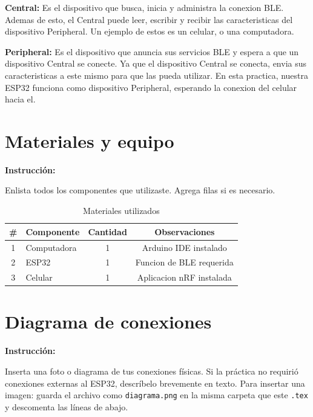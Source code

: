 \documentclass[12pt, letterpaper]{article}
\newenvironment{instruccion}{%
  \begin{mdframed}[
    backgroundcolor = tealLight,
    linecolor       = tealMain,
    linewidth       = 1pt,
    innerleftmargin = 10pt, innerrightmargin = 10pt,
    innertopmargin  = 6pt,  innerbottommargin= 6pt
  ]
  \small\color{tealMain}\textbf{Instrucción:}\hspace{4pt}\color{black}
}{%
  \end{mdframed}
}
\begin{document}
\textbf{Central:} Es el dispositivo que busca, inicia y administra la conexion BLE. Ademas de esto, el Central puede leer, escribir y recibir las caracteristicas del dispositivo Peripheral. Un ejemplo de estos es un celular, o una computadora.

\textbf{Peripheral:} Es el dispositivo que anuncia sus servicios BLE y espera a que un dispositivo Central se conecte. Ya que el dispositivo Central se conecta, envia sus caracteristicas a este mismo para que las pueda utilizar. En esta practica, nuestra ESP32 funciona como dispositivo Peripheral, esperando la conexion del celular hacia el.


\section{Materiales y equipo}

\begin{instruccion}
  Enlista todos los componentes que utilizaste. Agrega filas si es necesario.
\end{instruccion}

\begin{table}[H]
  \centering
  \caption{Materiales utilizados}
  \begin{tabular}{clcc}
    \toprule
    \textbf{\#} & \textbf{Componente} & \textbf{Cantidad} & \textbf{Observaciones} \\
    \midrule
    1 & Computadora& 1& Arduino IDE instalado\\[0.4em]
    2 & ESP32& 1& Funcion de BLE requerida\\[0.4em]
 3& Celular& 1&Aplicacion nRF instalada\\
  \end{tabular}
\end{table}


\section{Diagrama de conexiones}

\begin{instruccion}
  Inserta una foto o diagrama de tus conexiones físicas. Si la práctica no
  requirió conexiones externas al ESP32, descríbelo brevemente en texto.
  Para insertar una imagen: guarda el archivo como \texttt{diagrama.png}
  en la misma carpeta que este \texttt{.tex} y descomenta las líneas de abajo.
\end{instruccion}
\end{document}

